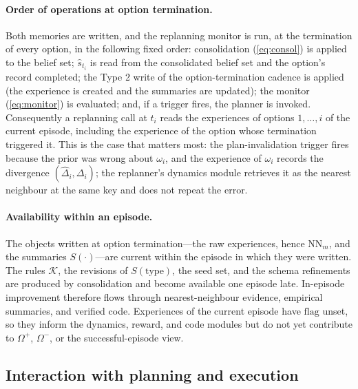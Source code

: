 \documentclass[11pt]{article}
\newcommand{\calK}{\mathcal{K}}
\newcommand{\shat}{\hat{s}}
\newcommand{\type}{\mathrm{type}}
\begin{document}
\paragraph{Order of operations at option termination.}
Both memories are written, and the replanning monitor is run, at the termination of every option, in the following fixed order: consolidation (\ref{eq:consol}) is applied to the belief set; $\shat_{t_i}$ is read from the consolidated belief set and the option's record completed; the Type 2 write of the option-termination cadence is applied (the experience is created and the summaries are updated); the monitor (\ref{eq:monitor}) is evaluated; and, if a trigger fires, the planner is invoked. Consequently a replanning call at $t_i$ reads the experiences of options $1,\dots,i$ of the current episode, including the experience of the option whose termination triggered it. This is the case that matters most: the plan-invalidation trigger fires because the prior was wrong about $\omega_i$, and the experience of $\omega_i$ records the divergence $(\hat\Delta_i,\Delta_i)$; the replanner's dynamics module retrieves it as the nearest neighbour at the same key and does not repeat the error.

\paragraph{Availability within an episode.}
The objects written at option termination---the raw experiences, hence $\mathrm{NN}_m$, and the summaries $S(\cdot)$---are current within the episode in which they were written. The rules $\calK$, the revisions of $S(\type)$, the seed set, and the schema refinements are produced by consolidation and become available one episode late. In-episode improvement therefore flows through nearest-neighbour evidence, empirical summaries, and verified code. Experiences of the current episode have $\mathrm{flag}$ unset, so they inform the dynamics, reward, and code modules but do not yet contribute to $\Omega^{+}$, $\Omega^{-}$, or the successful-episode view.

\subsection{Interaction with planning and execution}
\label{sec:type2-interaction}
\end{document}
